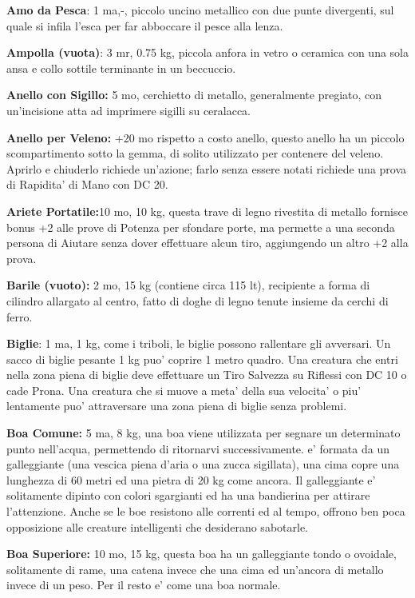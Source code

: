 \documentclass[a4paper,11pt,twoside,openany]{book}
\begin{document}
{\textbf{Amo da Pesca}: 1 ma,-, piccolo uncino metallico con due punte divergenti, sul quale si infila l'esca per far abboccare il pesce alla lenza.

\textbf{Ampolla (vuota)}: 3 mr, 0.75 kg, piccola anfora in vetro o ceramica con una sola ansa e collo sottile terminante in un beccuccio.

\textbf{Anello con Sigillo:} 5 mo, cerchietto di metallo, generalmente pregiato, con un'incisione atta ad imprimere sigilli su ceralacca. 

\textbf{Anello per Veleno:} +20 mo rispetto a costo anello, questo anello ha un piccolo scompartimento sotto la gemma, di solito utilizzato per contenere del veleno. Aprirlo e chiuderlo richiede un'azione; farlo senza essere notati richiede una prova di Rapidita' di Mano con DC 20.

\textbf{Ariete Portatile:}10 mo, 10 kg, questa trave di legno rivestita di metallo fornisce bonus +2 alle prove di Potenza per sfondare porte, ma permette a una seconda persona di Aiutare senza dover effettuare alcun tiro, aggiungendo un altro +2 alla prova.

\textbf{Barile (vuoto):} 2 mo, 15 kg (contiene circa 115 lt), recipiente a forma di cilindro allargato al centro, fatto di doghe di legno tenute insieme da cerchi di ferro.

\textbf{Biglie}: 1 ma, 1 kg, come i triboli, le biglie possono rallentare gli avversari. Un sacco di biglie pesante 1 kg puo' coprire 1 metro quadro. Una creatura che entri nella zona piena di biglie deve effettuare un Tiro Salvezza su Riflessi con DC 10 o cade Prona. Una creatura che si muove a meta' della sua velocita' o piu' lentamente puo' attraversare una zona piena di biglie senza problemi.

\textbf{Boa Comune:} 5 ma, 8 kg, una boa viene utilizzata per segnare un determinato punto nell'acqua, permettendo di ritornarvi successivamente. e' formata da un galleggiante (una vescica piena d'aria o una zucca sigillata), una cima copre una lunghezza di 60 metri ed una pietra di 20 kg come ancora. Il galleggiante e' solitamente dipinto con colori sgargianti ed ha una bandierina per attirare l'attenzione. Anche se le boe resistono alle correnti ed al tempo, offrono ben poca opposizione alle creature intelligenti che desiderano sabotarle.

\textbf{Boa Superiore:} 10 mo, 15 kg, questa boa ha un galleggiante tondo o ovoidale, solitamente di rame, una catena invece che una cima ed un'ancora di metallo invece di un peso. Per il resto e' come una boa normale.

}
\end{document}
